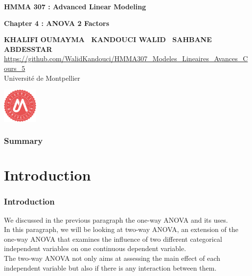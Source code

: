 \documentclass[unknownkeysallowed]{beamer}
\begin{document}
\begin{frame}[noframenumbering]
\thispagestyle{empty}
\bigskip
\bigskip
\begin{center}{
\LARGE\color{marron}
\textbf{HMMA 307 : Advanced Linear Modeling}
\textbf{ }\\
\vspace{0.5cm}
}

\color{marron}
\textbf{Chapter 4 : ANOVA 2 Factors}
\end{center}

\vspace{0.5cm}

\begin{center}
\textbf{KHALIFI OUMAYMA \ KANDOUCI WALID \ SAHBANE ABDESSTAR } \\
\vspace{0.1cm}
\url{https://github.com/WalidKandouci/HMMA307_Modeles_Lineaires_Avances_Cours_5}\\
\vspace{0.5cm}
Université de Montpellier \\
\end{center}

\centering
\includegraphics[width=0.13\textwidth]{Logo.pdf}
\end{frame}








\begin{frame}
\frametitle{Summary}
\tableofcontents
\end{frame}


\section{Introduction}
\begin{frame}
\frametitle{Introduction}
We discussed in the previous paragraph the one-way ANOVA and its uses.
\\
In this paragraph, we will be looking at two-way ANOVA, an extension of the one-way ANOVA that examines the influence of two different categorical independent variables on one continuous dependent variable. \\
The two-way ANOVA not only aims at assessing the main effect of each independent variable but also if there is any interaction between them.
\end{frame}
\end{document}
